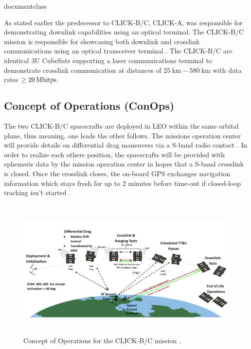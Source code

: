 \csname documentclass
\usepackage[utf8x]{inputenc}
\usepackage{blindtext}
\usepackage{float}
\usepackage{graphicx}
\usepackage{siunitx}
\usepackage{cite}
\usepackage{hyperref}
\usepackage{cleveref}



As stated earlier the predecessor to CLICK-B/C, CLICK-A, was responsible for demonstrating downlink capabilities using an optical terminal. 
The CLICK-B/C mission is responsible for showcasing both downlink and crosslink communications using an optical transceiver terminal \cite{click_b}.
The CLICK-B/C are identical 3U CubeSats supporting a laser communications terminal to demonstrate crosslink communication at distances of \(\qty{25}{\kilo\meter} - \qty{580}{\kilo\meter}\) with data rates \(\ge\qty[per-mode = symbol,per-symbol = p]{20}{\mega\bit\per\second}\).

\subsection{Concept of Operations (ConOps)}

The two CLICK-B/C spacecrafts are deployed in LEO within the same orbital plane, thus meaning, one leads the other follows.
The missions operation center will provide details on differential drag maneuvers via a S-band radio contact \cite{click_b_2}.
In order to realize each others position, the spacecrafts will be provided with ephemeris data by the mission operation center in hopes that a S-band crosslink is closed.
Once the crosslink closes, the on-board GPS exchanges navigation information which stays fresh for up to 2 minutes before time-out if closed-loop tracking isn't started \cite{click_b_2}.

\begin{figure}[t]
    \centering
    \includegraphics[width=\textwidth, height=200pt]{images/click_b_conops.PNG}
    \caption{Concept of Operations for the CLICK-B/C mission \cite{click_b}.}
    \label{fig:conops_b}
\end{figure}

